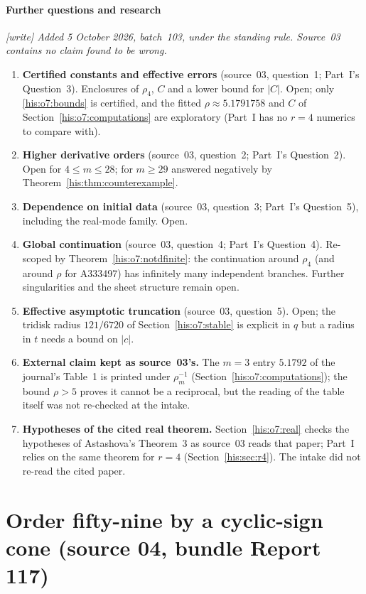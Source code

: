 \documentclass[11pt]{article}
\theoremstyle{remark}\newtheorem{remark}[theorem]{Remark}
\numberwithin{equation}{section}
\begin{document}
\subsection{Further questions and research}\label{his:o7:sec:further}
\emph{\textsf{[write]} Added 5 October 2026, batch~103, under the standing rule. Source~03 contains no claim found to be wrong.}
\begin{enumerate}
\item \textbf{Certified constants and effective errors} (source~03, question~1; Part~I's Question~3). Enclosures of $\rho_4$, $C$ and a lower bound for $|C|$. Open; only \eqref{his:o7:bounds} is certified, and the fitted $\rho\approx5.1791758$ and $C$ of Section~\ref{his:o7:computations} are exploratory (Part~I has no $r=4$ numerics to compare with).
\item \textbf{Higher derivative orders} (source~03, question~2; Part~I's Question~2). Open for $4\le m\le28$; for $m\ge29$ answered negatively by Theorem~\ref{his:thm:counterexample}.
\item \textbf{Dependence on initial data} (source~03, question~3; Part~I's Question~5), including the real-mode family. Open.
\item \textbf{Global continuation} (source~03, question~4; Part~I's Question~4). Re-scoped by Theorem~\ref{his:o7:notdfinite}: the continuation around $\rho_4$ (and around $\rho$ for A333497) has infinitely many independent branches. Further singularities and the sheet structure remain open.
\item \textbf{Effective asymptotic truncation} (source~03, question~5). Open; the tridisk radius $121/6720$ of Section~\ref{his:o7:stable} is explicit in $q$ but a radius in $t$ needs a bound on $|c|$.
\item \textbf{External claim kept as source~03's.} The $m=3$ entry $5.1792$ of the journal's Table~1 is printed under $\rho_m^{-1}$ (Section~\ref{his:o7:computations}); the bound $\rho>5$ proves it cannot be a reciprocal, but the reading of the table itself was not re-checked at the intake.
\item \textbf{Hypotheses of the cited real theorem.} Section~\ref{his:o7:real} checks the hypotheses of Astashova's Theorem~3 \cite{astashova2013} as source~03 reads that paper; Part~I relies on the same theorem for $r=4$ (Section~\ref{his:sec:r4}). The intake did not re-read the cited paper.
\end{enumerate}

\clearpage
\part{Order fifty-nine by a cyclic-sign cone (source 04, bundle Report 117)}\label{his:o59:part}
\end{document}
